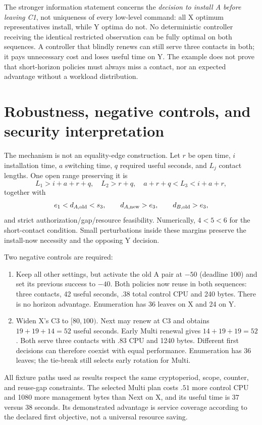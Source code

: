 \documentclass[11pt,a4paper]{article}
\begin{document}
The stronger information statement concerns the \emph{decision to install A before leaving C1}, not uniqueness of every low-level command: all X optimum representatives install, while Y optima do not. No deterministic controller receiving the identical restricted observation can be fully optimal on both sequences. A controller that blindly renews can still serve three contacts in both; it pays unnecessary cost and loses useful time on Y. The example does not prove that short-horizon policies must always miss a contact, nor an expected advantage without a workload distribution.

\section{Robustness, negative controls, and security interpretation}
The mechanism is not an equality-edge construction. Let $r$ be open time, $i$ installation time, $a$ switching time, $q$ required useful seconds, and $L_j$ contact lengths. One open range preserving it is
\[
 L_1>i+a+r+q,\quad L_2>r+q,\quad
 a+r+q<L_3<i+a+r,
\]
together with
\[
 e_1<d_{A,\rm old}<s_3,\qquad
 d_{A,\rm new}>e_3,\qquad d_{B,\rm old}>e_3,
\]
and strict authorization/gap/resource feasibility. Numerically, $4<5<6$ for the short-contact condition. Small perturbations inside these margins preserve the install-now necessity and the opposing Y decision.

Two negative controls are required:
\begin{enumerate}
\item Keep all other settings, but activate the old A pair at $-50$ (deadline $100$) and set its previous success to $-40$. Both policies now reuse in both sequences: three contacts, 42 useful seconds, $.38$ total control CPU and 240 bytes. There is no horizon advantage. Enumeration has 36 leaves on X and 24 on Y.
\item Widen X's C3 to $[80,100)$. Next may renew at C3 and obtains $19+19+14=52$ useful seconds. Early Multi renewal gives $14+19+19=52$. Both serve three contacts with $.83$ CPU and 1240 bytes. Different first decisions can therefore coexist with equal performance. Enumeration has 36 leaves; the tie-break still selects early rotation for Multi.
\end{enumerate}

All fixture paths used as results respect the same cryptoperiod, scope, counter, and reuse-gap constraints. The selected Multi plan costs $.51$ more control CPU and 1080 more management bytes than Next on X, and its useful time is $37$ versus $38$ seconds. Its demonstrated advantage is service coverage according to the declared first objective, not a universal resource saving.
\end{document}
